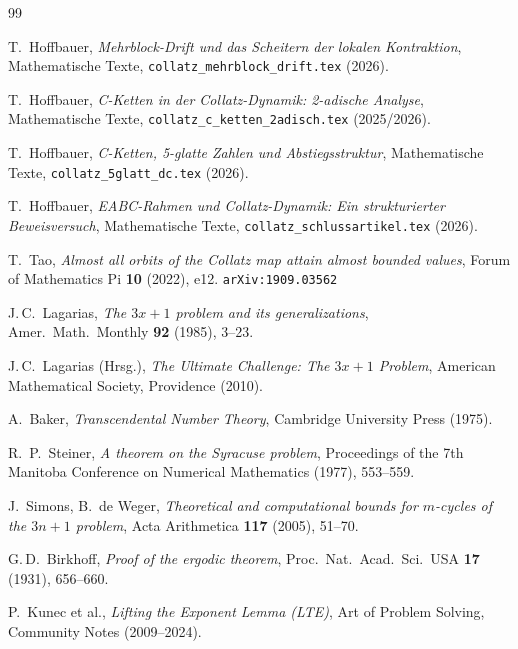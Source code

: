 \documentclass[12pt,a4paper]{article}
\begin{document}
\begin{thebibliography}{99}

T.\ Hoffbauer,
\textit{Mehrblock-Drift und das Scheitern der lokalen Kontraktion},
Mathematische Texte, \texttt{collatz\_mehrblock\_drift.tex} (2026).

T.\ Hoffbauer,
\textit{C-Ketten in der Collatz-Dynamik: 2-adische Analyse},
Mathematische Texte, \texttt{collatz\_c\_ketten\_2adisch.tex} (2025/2026).

T.\ Hoffbauer,
\textit{C-Ketten, 5-glatte Zahlen und Abstiegsstruktur},
Mathematische Texte, \texttt{collatz\_5glatt\_dc.tex} (2026).

T.\ Hoffbauer,
\textit{EABC-Rahmen und Collatz-Dynamik: Ein strukturierter Beweisversuch},
Mathematische Texte, \texttt{collatz\_schlussartikel.tex} (2026).

T.\ Tao,
\textit{Almost all orbits of the Collatz map attain almost bounded values},
Forum of Mathematics Pi \textbf{10} (2022), e12.
\texttt{arXiv:1909.03562}

J.\,C.\ Lagarias,
\textit{The $3x+1$ problem and its generalizations},
Amer.\ Math.\ Monthly \textbf{92} (1985), 3--23.

J.\,C.\ Lagarias (Hrsg.),
\textit{The Ultimate Challenge: The $3x+1$ Problem},
American Mathematical Society, Providence (2010).

A.\ Baker,
\textit{Transcendental Number Theory},
Cambridge University Press (1975).

R.\ P.\ Steiner,
\textit{A theorem on the Syracuse problem},
Proceedings of the 7th Manitoba Conference on Numerical Mathematics (1977), 553--559.

J.\ Simons, B.\ de Weger,
\textit{Theoretical and computational bounds for $m$-cycles of the $3n+1$ problem},
Acta Arithmetica \textbf{117} (2005), 51--70.

G.\,D.\ Birkhoff,
\textit{Proof of the ergodic theorem},
Proc.\ Nat.\ Acad.\ Sci.\ USA \textbf{17} (1931), 656--660.

P.\ Kunec et al.,
\textit{Lifting the Exponent Lemma (LTE)},
Art of Problem Solving, Community Notes (2009--2024).

\end{thebibliography}
\end{document}
